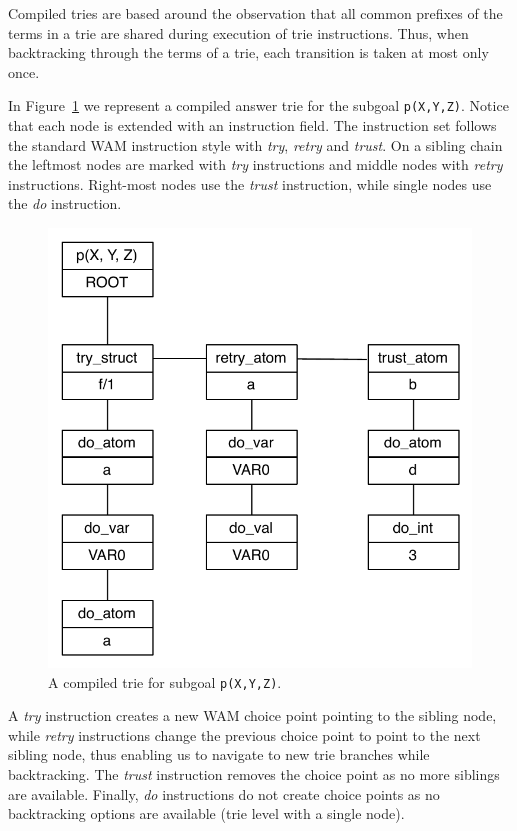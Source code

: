 Compiled tries are based around the observation that all common prefixes of the terms in a trie
are shared during execution of trie instructions. Thus, when backtracking
through the terms of a trie, each transition is taken at most only once.

In Figure~\ref{fig:compiled_trie} we represent a compiled answer trie for the subgoal
\texttt{p(X,Y,Z)}. Notice that each node is extended with an instruction field.
The instruction set follows the standard WAM instruction style with \textit{try}, \textit{retry} and \textit{trust}.
On a sibling chain the leftmost nodes are marked with \textit{try} instructions and middle
nodes with \textit{retry} instructions. Right-most nodes use the \textit{trust} instruction,
while single nodes use the \textit{do} instruction.

\begin{figure}[H]
  \centering
    \includegraphics[scale=0.6]{compiled_trie.pdf}
  \caption{A compiled trie for subgoal \texttt{p(X,Y,Z)}.}
  \label{fig:compiled_trie}
\end{figure}

A \textit{try} instruction creates a new WAM choice point pointing to the sibling node,
while \textit{retry} instructions change the previous choice point to point to the next sibling node,
thus enabling us to navigate to new trie branches while backtracking. The \textit{trust}
instruction removes the choice point as no more siblings are available. Finally, \textit{do}
instructions do not create choice points as no backtracking options are available (trie level with a single node).

